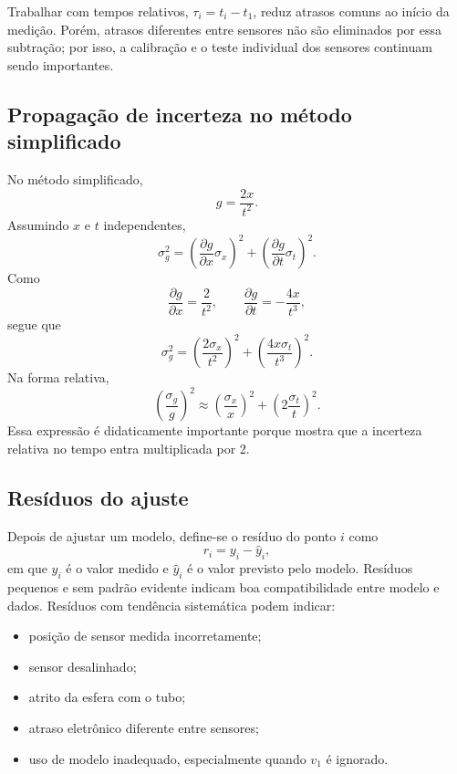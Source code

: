 \documentclass[11pt,a4paper]{article}
\begin{document}
Trabalhar com tempos relativos, $\tau_i=t_i-t_1$, reduz atrasos comuns ao início da medição. Porém, atrasos diferentes entre sensores não são eliminados por essa subtração; por isso, a calibração e o teste individual dos sensores continuam sendo importantes.

\subsection{Propagação de incerteza no método simplificado}

No método simplificado,
\begin{equation}
  g=\frac{2x}{t^2}.
\end{equation}
Assumindo $x$ e $t$ independentes,
\begin{equation}
  \sigma_g^2
  =\left(\frac{\partial g}{\partial x}\sigma_x\right)^2
  +\left(\frac{\partial g}{\partial t}\sigma_t\right)^2.
\end{equation}
Como
\begin{equation}
  \frac{\partial g}{\partial x}=\frac{2}{t^2},
  \qquad
  \frac{\partial g}{\partial t}=-\frac{4x}{t^3},
\end{equation}
segue que
\begin{equation}
  \sigma_g^2
  =\left(\frac{2\sigma_x}{t^2}\right)^2
  +\left(\frac{4x\sigma_t}{t^3}\right)^2.
\end{equation}
Na forma relativa,
\begin{equation}
  \left(\frac{\sigma_g}{g}\right)^2
  \approx
  \left(\frac{\sigma_x}{x}\right)^2
  +\left(2\frac{\sigma_t}{t}\right)^2.
\end{equation}
Essa expressão é didaticamente importante porque mostra que a incerteza relativa no tempo entra multiplicada por 2.

\subsection{Resíduos do ajuste}

Depois de ajustar um modelo, define-se o resíduo do ponto $i$ como
\begin{equation}
  r_i=y_i-\hat y_i,
\end{equation}
em que $y_i$ é o valor medido e $\hat y_i$ é o valor previsto pelo modelo. Resíduos pequenos e sem padrão evidente indicam boa compatibilidade entre modelo e dados. Resíduos com tendência sistemática podem indicar:

\begin{itemize}
  \item posição de sensor medida incorretamente;
  \item sensor desalinhado;
  \item atrito da esfera com o tubo;
  \item atraso eletrônico diferente entre sensores;
  \item uso de modelo inadequado, especialmente quando $v_1$ é ignorado.
\end{itemize}
\end{document}

